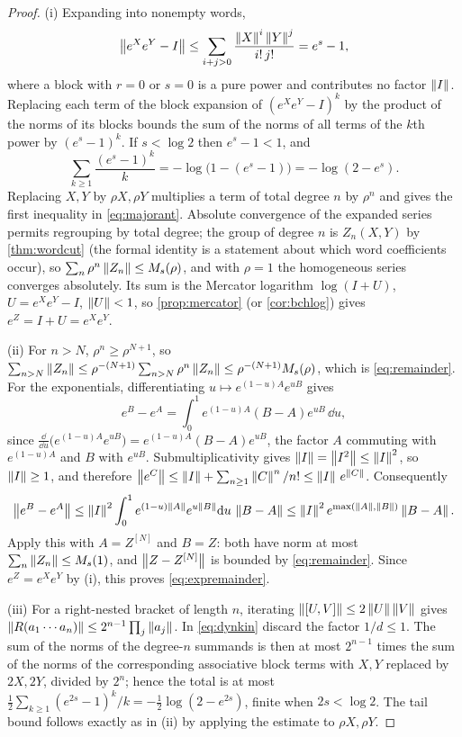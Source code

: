 \begin{proof}
(i) Expanding into nonempty words,
\[
 \left\lVert e^Xe^Y-I\right\rVert\leq\sum_{i+j>0}\frac{\left\lVert X\right\rVert^i\left\lVert Y\right\rVert^j}{i!\,j!}=e^{s}-1,
\]
where a block with $r=0$ or $s=0$ is a pure power and contributes no factor
$\left\lVert I\right\rVert$. Replacing each term of the block expansion of $(e^Xe^Y-I)^k$ by
the product of the norms of its blocks bounds the sum of the norms of all
terms of the $k$th power by $(e^s-1)^k$. If $s<\log2$ then $e^s-1<1$, and
\[
 \sum_{k\geq1}\frac{(e^s-1)^k}{k}=-\log\bigl(1-(e^s-1)\bigr)=-\log(2-e^s).
\]
Replacing $X,Y$ by $\rho X,\rho Y$ multiplies a term of total degree $n$ by $\rho^n$
and gives the first inequality in \eqref{eq:majorant}. Absolute convergence
of the expanded series permits regrouping by total degree; the group of
degree $n$ is $Z_n(X,Y)$ by \cref{thm:wordcut} (the formal identity is a
statement about which word coefficients occur), so
$\sum_n\rho^n\left\lVert Z_n\right\rVert\leq M_s(\rho)$, and with $\rho=1$ the homogeneous series
converges absolutely. Its sum is the Mercator logarithm $\log(I+U)$,
$U=e^Xe^Y-I$, $\left\lVert U\right\rVert<1$, so \cref{prop:mercator} (or
\cref{cor:bchlog}) gives $e^Z=I+U=e^Xe^Y$.

(ii) For $n>N$, $\rho^n\geq\rho^{N+1}$, so
$\sum_{n>N}\left\lVert Z_n\right\rVert\leq \rho^{-(N+1)}\sum_{n>N}\rho^n\left\lVert Z_n\right\rVert\leq\rho^{-(N+1)}M_s(\rho)$,
which is \eqref{eq:remainder}. For the exponentials, differentiating
$u\mapsto e^{(1-u)A}e^{uB}$ gives
\begin{equation}\label{eq:expdifference}
 e^B-e^A=\int_0^1e^{(1-u)A}(B-A)e^{uB}\,\dd u,
\end{equation}
since $\frac{\dd}{\dd u}\bigl(e^{(1-u)A}e^{uB}\bigr)=e^{(1-u)A}(B-A)e^{uB}$, the
factor $A$ commuting with $e^{(1-u)A}$ and $B$ with $e^{uB}$. Submultiplicativity gives $\left\lVert I\right\rVert=\left\lVert I^2\right\rVert\leq\left\lVert I\right\rVert^2$, so
$\left\lVert I\right\rVert\geq1$, and therefore
$\left\lVert e^C\right\rVert\leq\left\lVert I\right\rVert+\sum_{n\geq1}\left\lVert C\right\rVert^n/n!\leq\left\lVert I\right\rVert\,e^{\left\lVert C\right\rVert}$.
Consequently
\[
 \left\lVert e^B-e^A\right\rVert\leq\left\lVert I\right\rVert^2\int_0^1e^{(1-u)\left\lVert A\right\rVert}e^{u\left\lVert B\right\rVert}\mathrm{d} u\,\left\lVert B-A\right\rVert
 \leq\left\lVert I\right\rVert^2e^{\max(\left\lVert A\right\rVert,\left\lVert B\right\rVert)}\left\lVert B-A\right\rVert.
\]
Apply this with $A=Z^{[N]}$ and $B=Z$: both have norm at most
$\sum_n\left\lVert Z_n\right\rVert\leq M_s(1)$, and $\left\lVert Z-Z^{[N]}\right\rVert$ is bounded by
\eqref{eq:remainder}. Since $e^Z=e^Xe^Y$ by (i), this proves
\eqref{eq:expremainder}.

(iii) For a right-nested bracket of length $n$, iterating
$\left\lVert[U,V]\right\rVert\leq2\left\lVert U\right\rVert\left\lVert V\right\rVert$ gives
$\left\lVert R(a_1\cdots a_n)\right\rVert\leq2^{n-1}\prod_j\left\lVert a_j\right\rVert$. In \eqref{eq:dynkin}
discard the factor $1/d\leq1$. The sum of the norms of the degree-$n$
summands is then at most $2^{n-1}$ times the sum of the norms of the
corresponding associative block terms with $X,Y$ replaced by $2X,2Y$, divided
by $2^n$; hence the total is at most
$\frac12\sum_{k\geq1}(e^{2s}-1)^k/k=-\frac12\log(2-e^{2s})$, finite when
$2s<\log2$. The tail bound follows exactly as in (ii) by applying the
estimate to $\rho X,\rho Y$.


\end{proof}
